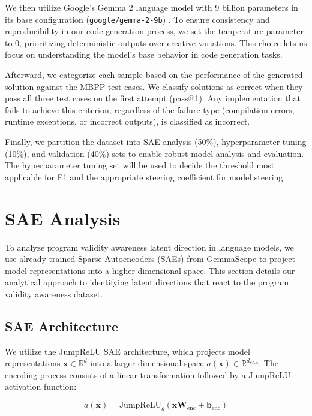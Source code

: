 We then utilize Google's Gemma 2 language model with 9 billion parameters in its base configuration (\texttt{google/gemma-2-9b}) \cite{team2024gemma}. To ensure consistency and reproducibility in our code generation process, we set the temperature parameter to 0, prioritizing deterministic outputs over creative variations. This choice lets us focus on understanding the model's base behavior in code generation tasks.

Afterward, we categorize each sample based on the performance of the generated solution against the MBPP test cases. We classify solutions as correct when they pass all three test cases on the first attempt (pass@1). Any implementation that fails to achieve this criterion, regardless of the failure type (compilation errors, runtime exceptions, or incorrect outputs), is classified as incorrect.

Finally, we partition the dataset into SAE analysis (50\%), hyperparameter tuning (10\%), and validation (40\%) sets to enable robust model analysis and evaluation. The hyperparameter tuning set will be used to decide the threshold most applicable for F1 and the appropriate steering coefficient for model steering. 

\section{SAE Analysis}

To analyze program validity awareness latent direction in language models, we use already trained Sparse Autoencoders (SAEs) from GemmaScope \cite{lieberum2024gemma} to project model representations into a higher-dimensional space. This section details our analytical approach to identifying latent directions that react to the program validity awareness dataset.

\subsection{SAE Architecture}

We utilize the JumpReLU SAE architecture, which projects model representations $\mathbf{x} \in \mathbb{R}^d$ into a larger dimensional space $a(\mathbf{x}) \in \mathbb{R}^{d_{\text{SAE}}}$. The encoding process consists of a linear transformation followed by a JumpReLU activation function:

\begin{equation}
    a(\mathbf{x})=\text{JumpReLU}_{\theta}(\mathbf{xW}_{\text{enc}}+\mathbf{b}_{\text{enc}})
\end{equation}

